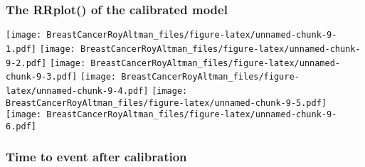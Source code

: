 \documentclass[
]{article}
\newenvironment{Shaded}{\begin{snugshade}}{\end{snugshade}}
\newcommand{\AttributeTok}[1]{\textcolor[rgb]{0.77,0.63,0.00}{#1}}
\newcommand{\FloatTok}[1]{\textcolor[rgb]{0.00,0.00,0.81}{#1}}
\newcommand{\FunctionTok}[1]{\textcolor[rgb]{0.00,0.00,0.00}{#1}}
\newcommand{\NormalTok}[1]{#1}
\newcommand{\OtherTok}[1]{\textcolor[rgb]{0.56,0.35,0.01}{#1}}
\newcommand{\SpecialCharTok}[1]{\textcolor[rgb]{0.00,0.00,0.00}{#1}}
\newcommand{\StringTok}[1]{\textcolor[rgb]{0.31,0.60,0.02}{#1}}
\begin{document}
\hypertarget{the-rrplot-of-the-calibrated-model}{%
\subsubsection{The RRplot() of the calibrated
model}\label{the-rrplot-of-the-calibrated-model}}

\begin{Shaded}
\end{Shaded}

\texttt{[image: BreastCancerRoyAltman\_files/figure-latex/unnamed-chunk-9-1.pdf]}
\texttt{[image: BreastCancerRoyAltman\_files/figure-latex/unnamed-chunk-9-2.pdf]}
\texttt{[image: BreastCancerRoyAltman\_files/figure-latex/unnamed-chunk-9-3.pdf]}
\texttt{[image: BreastCancerRoyAltman\_files/figure-latex/unnamed-chunk-9-4.pdf]}
\texttt{[image: BreastCancerRoyAltman\_files/figure-latex/unnamed-chunk-9-5.pdf]}
\texttt{[image: BreastCancerRoyAltman\_files/figure-latex/unnamed-chunk-9-6.pdf]}

\hypertarget{time-to-event-after-calibration}{%
\subsubsection{Time to event after
calibration}\label{time-to-event-after-calibration}}
\end{document}
